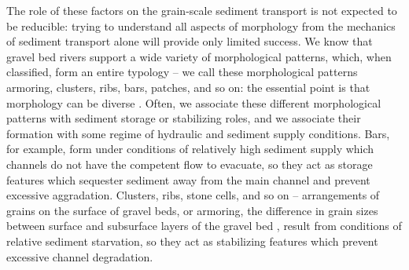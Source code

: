 \documentclass{article}
\begin{document}
The role of these factors on the grain-scale sediment transport is not expected to be reducible: trying to understand all aspects of morphology from the mechanics of sediment transport alone will provide only limited success. 
We know that gravel bed rivers support a wide variety of morphological patterns, which, when classified, form an entire typology -- we call these morphological patterns armoring, clusters, ribs, bars, patches, and so on: the essential point is that morphology can be diverse \citep{Church1998, Hassan2008, Venditti2017}. 
Often, we associate these different morphological patterns with sediment storage or stabilizing roles, and we associate their formation with some regime of hydraulic and sediment supply conditions. 
Bars, for example, form under conditions of relatively high sediment supply which channels do not have the competent flow to evacuate, so they act as storage features which sequester sediment away from the main channel and prevent excessive aggradation. 
Clusters, ribs, stone cells, and so on -- arrangements of grains on the surface of gravel beds, or armoring, the difference in grain sizes between surface and subsurface layers of the gravel bed \citep{Parker1982}, result from conditions of relative sediment starvation, so they act as stabilizing features which prevent excessive channel degradation. 
\end{document}
